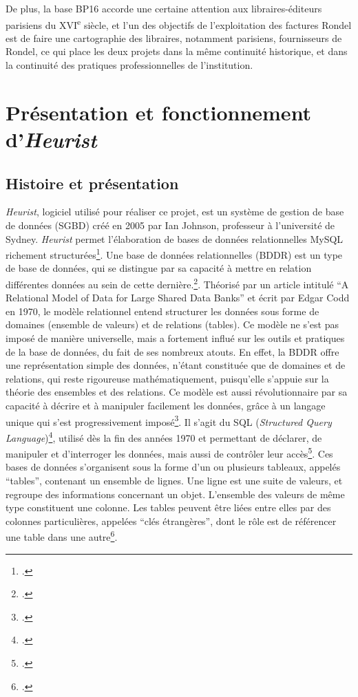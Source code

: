 De plus, la base BP16 accorde une certaine attention aux libraires-éditeurs parisiens du XVI\textsuperscript{e} siècle, et l'un des objectifs de l'exploitation des factures Rondel est de faire une cartographie des libraires, notamment parisiens, fournisseurs de Rondel, ce qui place les deux projets dans la même continuité historique, et dans la continuité des pratiques professionnelles de l'institution. 

\section{Présentation et fonctionnement d'\emph{Heurist}}

\subsection{Histoire et présentation}


\emph{Heurist}, logiciel utilisé pour réaliser ce projet, est un système de gestion de base de données (SGBD) créé en 2005 par Ian Johnson, professeur à l'université de Sydney. \emph{Heurist} permet l'élaboration de bases de données relationnelles MySQL richement structurées\footcite{huma-num_heurist_2026}. Une base de données relationnelles (BDDR) est un type de base de données, qui se distingue par sa capacité à mettre en relation différentes données au sein de cette dernière.\footcite{marina_hervieu_2025}. Théorisé par un article intitulé \enquote{A Relational Model of Data for Large Shared Data Banks} et écrit par Edgar Codd en 1970, le modèle relationnel entend structurer les données sous forme de domaines (ensemble de valeurs) et de relations (tables). Ce modèle ne s'est pas imposé de manière universelle, mais a fortement influé sur les outils et pratiques de la base de données, du fait de ses nombreux atouts. En effet, la BDDR offre une représentation simple des données, n'étant constituée que de domaines et de relations, qui reste rigoureuse mathématiquement, puisqu'elle s'appuie sur la théorie des ensembles et des relations. Ce modèle est aussi révolutionnaire par sa capacité à décrire et à manipuler facilement les données, grâce à un langage unique qui s'est progressivement imposé\footcite[p. 45-47]{Hainaut_2015}. Il s'agit du SQL (\emph{Structured Query Language})\footcite[p. 191]{Hainaut_2015}, utilisé dès la fin des années 1970 et permettant de déclarer, de manipuler et d'interroger les données, mais aussi de contrôler leur accès\footcite[p. 166]{Soutou_2022}. 
Ces bases de données s'organisent sous la forme d'un ou plusieurs tableaux, appelés \enquote{tables}, contenant un ensemble de lignes. Une ligne est une suite de valeurs, et regroupe des informations concernant un objet. L'ensemble des valeurs de même type constituent une colonne. Les tables peuvent être liées entre elles par des colonnes particulières, appelées \enquote{clés étrangères}, dont le rôle est de référencer une table dans une autre\footcite[p. 44-54]{Hainaut_2015}. 


